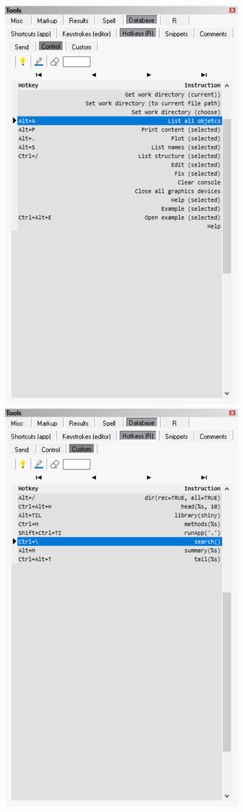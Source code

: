 \begin{figure}[H]
  \includegraphics[scale=0.35]{./res/tools_database_rh_control.png}\\
  \includegraphics[scale=0.35]{./res/tools_database_rh_custom.png}~~

\end{figure}
